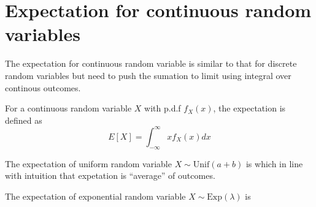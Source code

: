 \section{Expectation for continuous random variables}
The expectation for continuous random variable is similar to that for discrete random variables but need to push the sumation to limit using integral over continous outcomes.

For a continuous random variable $X$ with p.d.f $f_X(x)$, the expectation is defined as
$$E[X] = \int_{-\infty}^{\infty} xf_X(x) dx$$

\begin{exmp}{}
The expectation of uniform random variable $X\sim \textrm{Unif}(a+b)$ is
which in line with intuition that expetation is ``average'' of outcomes.
\end{exmp}

\begin{exmp}{}
	The expectation of exponential random variable $X\sim \textrm{Exp}(\lambda)$ is
\end{exmp}

